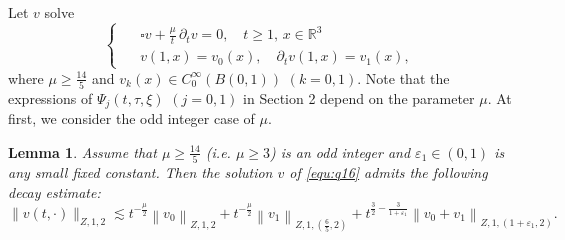 \documentclass[11pt,twoside]{article}
\newcommand{\R}{\mathbb R}
\newcommand{\p}{\partial}
\newcommand{\f}{\frac}
\theoremstyle{plain}
\newtheorem{lemma}[theorem]{Lemma}
\theoremstyle{definition}
\theoremstyle{remark}
\numberwithin{equation}{section}
\begin{document}
Let $v$ solve
\begin{equation}\label{equ:q16}
\left\{ \enspace
\begin{aligned}
&\square v +\f{\mu}{t}\,\p_tv=0, \quad
t\geq 1, \,x\in\R^3\\
&v(1,x)=v_0(x), \quad \partial_{t} v(1,x)=v_1(x),
\end{aligned}
\right.
\end{equation}
where $\mu\geq \f{14}{5}$ and $v_k(x)\in C_0^{\infty}(B(0, 1))$ $(k=0, 1)$. Note
that the expressions of $\Psi_j(t,\tau,\xi)$ $(j=0,1)$ in Section 2 depend on the parameter $\mu$. At first,
we consider the odd integer case of $\mu$.
\begin{lemma}\label{lem2}
Assume that $\mu\geq \f{14}{5}$ (i.e. $\mu\ge3$) is an odd integer and  $\varepsilon_1\in(0, 1)$ is any small fixed constant.
Then the solution
$v$ of \eqref{equ:q16} admits the following decay estimate:
\begin{equation}\label{equ:q17}
\|v(t, \cdot)\|_{Z, 1, 2} \lesssim t^{-\f{\mu}{2}}\left\|v_0\right\|_{Z, 1, 2}
+t^{-\f{\mu}{2}}\left\|v_1\right\|_{Z, 1,(\f{6}{5}, 2)}
+t^{\f{3}{2}-\f{3}{1+\varepsilon_1}}\left\|v_0+v_1\right\|_{Z, 1,(1+\varepsilon_1, 2)}.
\end{equation}
\end{lemma}
\end{document}
